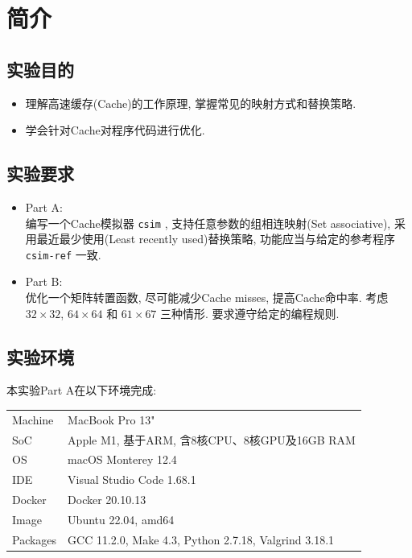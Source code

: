 
\section{简介}

\subsection{实验目的}

\begin{itemize}[noitemsep]
    \item 理解高速缓存(Cache)的工作原理, 掌握常见的映射方式和替换策略.
    \item 学会针对Cache对程序代码进行优化.
\end{itemize}

\subsection{实验要求}

\begin{itemize}
  \item Part A: \\编写一个Cache模拟器 \verb|csim| , 支持任意参数的组相连映射(Set associative), 采用最近最少使用(Least recently used)替换策略, 功能应当与给定的参考程序 \verb|csim-ref| 一致.
  \item Part B: \\优化一个矩阵转置函数, 尽可能减少Cache misses, 提高Cache命中率. 考虑 $32 \times 32$, $ 64 \times 64$ 和 $ 61 \times 67$ 三种情形. 要求遵守给定的编程规则.
\end{itemize}

\subsection{实验环境}

本实验Part A在以下环境完成:
\begin{center}
    \small
    \begin{tabular}{ll}
      \toprule
      Machine & MacBook Pro 13" \\
      SoC & Apple M1, 基于ARM, 含8核CPU、8核GPU及16GB RAM \\
      OS & macOS Monterey 12.4 \\
      IDE & Visual Studio Code 1.68.1 \\
      Docker & Docker 20.10.13 \\
      Image & Ubuntu 22.04, amd64 \\
      Packages & GCC 11.2.0, Make 4.3, Python 2.7.18, Valgrind 3.18.1\\
      \bottomrule
    \end{tabular}
\end{center}


